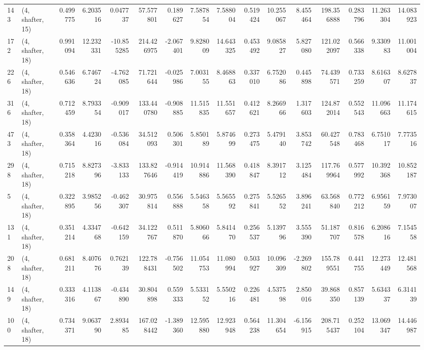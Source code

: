 \begin{tabular}{llrrrrrrrrrrrrrr}
143 &  (4, shafter, 15) &   0.499775 &   6.203516 &   0.047737 &    57.577801 &   0.189627 &   7.587854 &   7.588004 &  0.519424 &  10.255067 &   8.455464 &   198.356888 &   0.283796 &  11.263304 &  14.083923 \\
172 &  (4, shafter, 18) &   0.991094 &  12.232331 & -10.855285 &   214.426975 &  -2.067401 &   9.828009 &  14.643325 &  0.453492 &   9.085827 &   5.827080 &   121.022097 &   0.566338 &   9.330983 &  11.001004 \\
226 &  (4, shafter, 18) &   0.546636 &   6.746724 &  -4.762085 &    71.721644 &  -0.025986 &   7.003155 &   8.468863 &  0.337010 &   6.752086 &   0.445898 &    74.439571 &   0.733259 &   8.616307 &   8.627837 \\
316 &  (4, shafter, 18) &   0.712459 &   8.793354 &  -0.909017 &   133.440780 &  -0.908885 &  11.515835 &  11.551657 &  0.412621 &   8.266966 &   1.317603 &   124.872014 &   0.552543 &  11.096663 &  11.174615 \\
473 &  (4, shafter, 18) &   0.358364 &   4.423016 &  -0.536084 &    34.512093 &   0.506301 &   5.850189 &   5.874699 &  0.273475 &   5.479140 &   3.853742 &    60.427548 &   0.783468 &   6.751017 &   7.773516 \\
298 &  (4, shafter, 18) &   0.715218 &   8.827396 &  -3.833133 &   133.827646 &  -0.914419 &  10.914886 &  11.568390 &  0.418847 &   8.391712 &   3.125484 &   117.769964 &   0.577992 &  10.392368 &  10.852187 \\
5   &  (4, shafter, 18) &   0.322895 &   3.985256 &  -0.462307 &    30.975814 &   0.556888 &   5.546358 &   5.565592 &  0.275841 &   5.526552 &   3.896241 &    63.568840 &   0.772212 &   6.956159 &   7.973007 \\
131 &  (4, shafter, 18) &   0.351214 &   4.334768 &  -0.642159 &    34.122767 &   0.511870 &   5.806066 &   5.841470 &  0.256537 &   5.139796 &   3.555390 &    51.187707 &   0.816578 &   6.208616 &   7.154558 \\
208 &  (4, shafter, 18) &   0.681211 &   8.407676 &   0.762139 &   122.788431 &  -0.756502 &  11.054753 &  11.080994 &  0.503927 &  10.096309 &  -2.269802 &   155.789551 &   0.441755 &  12.273449 &  12.481568 \\
149 &  (4, shafter, 18) &   0.333316 &   4.113867 &  -0.434890 &    30.804898 &   0.559333 &   5.533152 &   5.550216 &  0.226481 &   4.537598 &   2.850016 &    39.868350 &   0.857139 &   5.634337 &   6.314139 \\
100 &  (4, shafter, 18) &   0.734371 &   9.063790 &   2.893485 &   167.028442 &  -1.389360 &  12.595880 &  12.923948 &  0.564238 &  11.304654 &  -6.156915 &   208.715437 &   0.252104 &  13.069347 &  14.446987 \\

\end{tabular}
